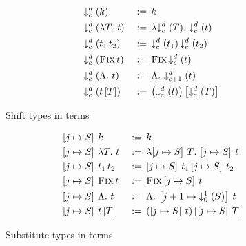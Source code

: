 \begin{subfigure}[t]{0.45\linewidth}
    \begin{alignat*}{2}
        &\tshift{d}{c}{k} &&\defeq k \\
        &\tshift{d}{c}{\abs{T}{t}} &&\defeq \abs{\tshift{d}{c}{T}}{\tshift{d}{c}{t}} \\
        &\tshift{d}{c}{\app{t_1}{t_2}} &&\defeq \app{\tshift{d}{c}{t_1}}{\tshift{d}{c}{t_2}} \\
        &\tshift{d}{c}{\fixpoint{t}} &&\defeq \fixpoint{\tshift{d}{c}{t}} \\
        &\tshift{d}{c}{\tabs{t}} &&\defeq \tabs{\tshift{d}{c+1}{t}} \\
        &\tshift{d}{c}{\tapp{t}{T}} &&\defeq \tapp{\left(\tshift{d}{c}{t}\right)}{\tshift{d}{c}{T}}
    \end{alignat*}
    \caption{Shift types in terms}
\end{subfigure}
\hfill
\begin{subfigure}[t]{0.45\linewidth}
    \begin{alignat*}{2}
        &\substitution{j}{S}{k} &&\defeq k \\
        &\substitution{j}{S}{\abs{T}{t}} &&\defeq \abs{\substitution{j}{S}{T}}{\substitution{j}{S}{t}} \\
        &\substitution{j}{S}{\app{t_1}{t_2}} &&\defeq \app{\substitution{j}{S}{t_1}}{\substitution{j}{S}{t_2}} \\
        &\substitution{j}{S}{\fixpoint{t}} &&\defeq \fixpoint{\substitution{j}{S}{t}} \\
        &\substitution{j}{S}{\tabs{t}} &&\defeq \tabs{\substitution{j+1}{\tshift{1}{0}{S}}{t}} \\
        &\substitution{j}{S}{\tapp{t}{T}} &&\defeq \tapp{(\substitution{j}{S}{t})}{\substitution{j}{S}{T}}
    \end{alignat*}
    \caption{Substitute types in terms}
\end{subfigure}


